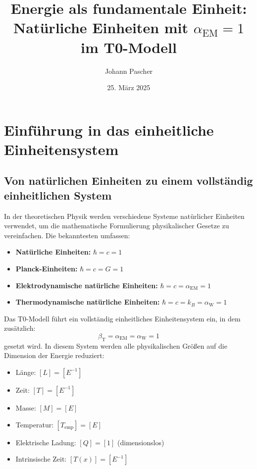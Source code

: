 \documentclass[12pt,a4paper]{article}
\newcommand{\Tfield}{T(x)}
\newcommand{\betaT}{\beta_{\text{T}}}
\newcommand{\alphaEM}{\alpha_{\text{EM}}}
\newcommand{\alphaW}{\alpha_{\text{W}}}
\begin{document}
	
	\title{Energie als fundamentale Einheit: \\ Natürliche Einheiten mit \(\alphaEM = 1\) im T0-Modell}
	\author{Johann Pascher}
	\date{25. März 2025}
	
	\maketitle
	\tableofcontents
	\newpage
	
	\section{Einführung in das einheitliche Einheitensystem}
	\label{sec:intro}
	
	\subsection{Von natürlichen Einheiten zu einem vollständig einheitlichen System}
	\label{subsec:natural_units}
	
	In der theoretischen Physik werden verschiedene Systeme natürlicher Einheiten verwendet, um die mathematische Formulierung physikalischer Gesetze zu vereinfachen. Die bekanntesten umfassen:
	
	\begin{itemize}
		\item \textbf{Natürliche Einheiten:} \(\hbar = c = 1\)
		\item \textbf{Planck-Einheiten:} \(\hbar = c = G = 1\)
		\item \textbf{Elektrodynamische natürliche Einheiten:} \(\hbar = c = \alphaEM = 1\)
		\item \textbf{Thermodynamische natürliche Einheiten:} \(\hbar = c = k_B = \alphaW = 1\)
	\end{itemize}
	
	Das T0-Modell führt ein vollständig einheitliches Einheitensystem ein, in dem zusätzlich:
	\begin{equation}
		\label{eq:unified_system}
		\betaT = \alphaEM = \alphaW = 1
	\end{equation}
	gesetzt wird. In diesem System werden alle physikalischen Größen auf die Dimension der Energie reduziert:
	
	\begin{tcolorbox}[colback=blue!5!white,colframe=blue!75!black,title=Dimensionen im einheitlichen Einheitensystem]
		\begin{itemize}
			\item Länge: \([L] = [E^{-1}]\)
			\item Zeit: \([T] = [E^{-1}]\)
			\item Masse: \([M] = [E]\)
			\item Temperatur: \([T_{\text{emp}}] = [E]\)
			\item Elektrische Ladung: \([Q] = [1]\) (dimensionslos)
			\item Intrinsische Zeit: \([\Tfield] = [E^{-1}]\)
		\end{itemize}
	\end{tcolorbox}
	
\end{document}

